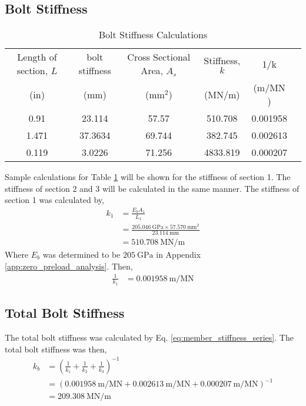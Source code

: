 \subsection{Bolt Stiffness}
\begin{table}[h]
    \centering
    \caption{Bolt Stiffness Calculations}
    \label{tab:bolt_stiffness}
    \begin{tabular}{cccccc}
    \toprule
    Length of section, $L$	& bolt stiffness	& Cross Sectional Area, $A_s$	& Stiffness, $k$	& 1/k \\
    (in)	& (mm)	& (mm$^2$)	& ($\unit{\mega\newton\per\meter}$)	& ($\unit{\meter\per\mega\newton}$) \\
    \midrule
    0.91	& 23.114	& 57.57 & 510.708 & 0.001958 \\
    1.471	& 37.3634	& 69.744 & 382.745 & 0.002613 \\
    0.119	& 3.0226	& 71.256 & 4833.819 & 0.000207 \\
    \bottomrule
    \end{tabular}
\end{table}
Sample calculations for Table \ref{tab:bolt_stiffness} will be shown for the stiffness of section 1. The stiffness of section 2 and 3 will be calculated in the same manner. The stiffness of section 1 was calculated by,
\begin{align*}
    k_1 &= \frac{E_b A_1}{L_1} \\
    &= \frac{\qty{205.046}{\giga\pascal} \times \qty{57.570}{\milli\meter\squared}}{\qty{23.114}{\milli\meter}} \\
    &= \qty{510.708}{\mega\newton\per\meter}
\end{align*}
Where $E_b$ was determined to be $\qty{205}{\giga\pascal}$ in Appendix \ref{app:zero_preload_analysis}. Then,
\begin{align*}
    \frac{1}{k_1} &= \qty{0.001958}{\meter\per\mega\newton}
\end{align*}

\subsection{Total Bolt Stiffness}
The total bolt stiffness was calculated by Eq. \ref{eq:member_stiffness_series}. The total bolt stiffness was then,
\begin{align*}
    k_b &= \left(\frac{1}{k_1} + \frac{1}{k_2} + \frac{1}{k_3}\right)^{-1} \\
    &= \left(\qty{0.001958}{\meter\per\mega\newton} + \qty{0.002613}{\meter\per\mega\newton} + \qty{0.000207}{\meter\per\mega\newton}\right)^{-1} \\
    &= \boxed{\qty{209.308}{\mega\newton\per\meter}}
\end{align*}